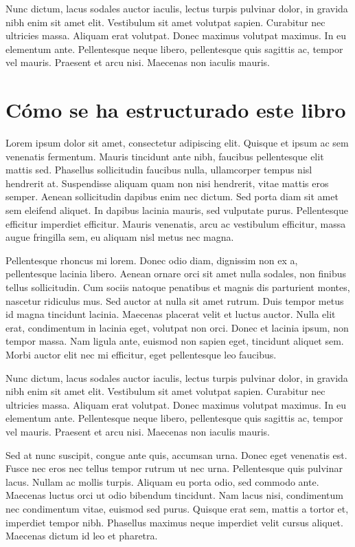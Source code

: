 Nunc dictum, lacus sodales auctor iaculis, lectus turpis pulvinar dolor, in
gravida nibh enim sit amet elit. Vestibulum sit amet volutpat sapien. Curabitur
nec ultricies massa. Aliquam erat volutpat. Donec maximus volutpat maximus. In
eu elementum ante. Pellentesque neque libero, pellentesque quis sagittis ac,
tempor vel mauris. Praesent et arcu nisi. Maecenas non iaculis mauris.

\section{Cómo se ha estructurado este libro}

Lorem ipsum dolor sit amet, consectetur adipiscing elit. Quisque et ipsum ac
sem venenatis fermentum. Mauris tincidunt ante nibh, faucibus pellentesque elit
mattis sed. Phasellus sollicitudin faucibus nulla, ullamcorper tempus nisl
hendrerit at. Suspendisse aliquam quam non nisi hendrerit, vitae mattis eros
semper. Aenean sollicitudin dapibus enim nec dictum. Sed porta diam sit amet
sem eleifend aliquet. In dapibus lacinia mauris, sed vulputate purus.
Pellentesque efficitur imperdiet efficitur. Mauris venenatis, arcu ac
vestibulum efficitur, massa augue fringilla sem, eu aliquam nisl metus nec
magna.

Pellentesque rhoncus mi lorem. Donec odio diam, dignissim non ex a,
pellentesque lacinia libero. Aenean ornare orci sit amet nulla sodales, non
finibus tellus sollicitudin. Cum sociis natoque penatibus et magnis dis
parturient montes, nascetur ridiculus mus. Sed auctor at nulla sit amet rutrum.
Duis tempor metus id magna tincidunt lacinia. Maecenas placerat velit et luctus
auctor. Nulla elit erat, condimentum in lacinia eget, volutpat non orci. Donec
et lacinia ipsum, non tempor massa. Nam ligula ante, euismod non sapien eget,
tincidunt aliquet sem. Morbi auctor elit nec mi efficitur, eget pellentesque
leo faucibus.

Nunc dictum, lacus sodales auctor iaculis, lectus turpis pulvinar dolor, in
gravida nibh enim sit amet elit. Vestibulum sit amet volutpat sapien. Curabitur
nec ultricies massa. Aliquam erat volutpat. Donec maximus volutpat maximus. In
eu elementum ante. Pellentesque neque libero, pellentesque quis sagittis ac,
tempor vel mauris. Praesent et arcu nisi. Maecenas non iaculis mauris.

Sed at nunc suscipit, congue ante quis, accumsan urna. Donec eget venenatis
est. Fusce nec eros nec tellus tempor rutrum ut nec urna. Pellentesque quis
pulvinar lacus. Nullam ac mollis turpis. Aliquam eu porta odio, sed commodo
ante. Maecenas luctus orci ut odio bibendum tincidunt. Nam lacus nisi,
condimentum nec condimentum vitae, euismod sed purus. Quisque erat sem, mattis
a tortor et, imperdiet tempor nibh. Phasellus maximus neque imperdiet velit
cursus aliquet. Maecenas dictum id leo et pharetra.

